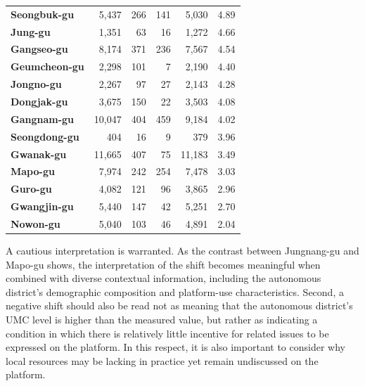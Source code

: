 \begin{table}[htbp]
\begin{tabularx}{\textwidth}{l r r r r r}
    \textbf{Seongbuk-gu}    & 5{,}437  & 266 & 141 & 5{,}030  & 4.89 \\
    \textbf{Jung-gu}        & 1{,}351  & 63  & 16  & 1{,}272  & 4.66 \\
    \textbf{Gangseo-gu}     & 8{,}174  & 371 & 236 & 7{,}567  & 4.54 \\
    \textbf{Geumcheon-gu}   & 2{,}298  & 101 & 7   & 2{,}190  & 4.40 \\
    \textbf{Jongno-gu}      & 2{,}267  & 97  & 27  & 2{,}143  & 4.28 \\
    \textbf{Dongjak-gu}     & 3{,}675  & 150 & 22  & 3{,}503  & 4.08 \\
    \textbf{Gangnam-gu}     & 10{,}047 & 404 & 459 & 9{,}184  & 4.02 \\
    \textbf{Seongdong-gu}   & 404      & 16  & 9   & 379      & 3.96 \\
    \textbf{Gwanak-gu}      & 11{,}665 & 407 & 75  & 11{,}183 & 3.49 \\
    \textbf{Mapo-gu}        & 7{,}974  & 242 & 254 & 7{,}478  & 3.03 \\
    \textbf{Guro-gu}        & 4{,}082  & 121 & 96  & 3{,}865  & 2.96 \\
    \textbf{Gwangjin-gu}    & 5{,}440  & 147 & 42  & 5{,}251  & 2.70 \\
    \textbf{Nowon-gu}       & 5{,}040  & 103 & 46  & 4{,}891  & 2.04 \\
    \bottomrule
  \end{tabularx}
\end{table}


A cautious interpretation is warranted. As the contrast between Jungnang-gu and Mapo-gu shows, the interpretation of the shift becomes meaningful when combined with diverse contextual information, including the autonomous district's demographic composition and platform-use characteristics. Second, a negative shift should also be read not as meaning that the autonomous district's UMC level is higher than the measured value, but rather as indicating a condition in which there is relatively little incentive for related issues to be expressed on the platform. In this respect, it is also important to consider why local resources may be lacking in practice yet remain undiscussed on the platform.

